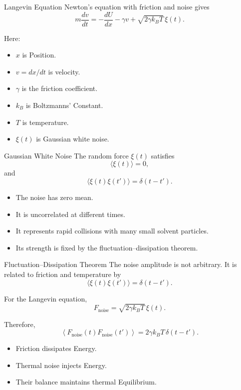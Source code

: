 \documentclass[a4paper, 10pt, onepage]{elegantbook}
\begin{document}
{\begin{frame}{Langevin Equation}
  Newton's equation with friction and noise gives
  \[
    m\frac{dv}{dt}
    =
    -\frac{dU}{dx}
    -
    \gamma v
    +
    \sqrt{2\gamma k_BT}\,\xi(t).
  \]

  Here:
  \begin{itemize}
    \item \(x\) is Position.
    \item \(v=dx/dt\) is velocity.
    \item \(\gamma\) is the friction coefficient.
    \item \(k_B\) is Boltzmanns' Constant.
    \item \(T\) is temperature.
    \item \(\xi(t)\) is Gaussian white noise.
  \end{itemize}
\end{frame}

\begin{frame}{Gaussian White Noise}
  The random force \(\xi(t)\) satisfies
  \[
    \langle\xi(t)\rangle=0,
  \]
  and
  \[
    \langle\xi(t)\xi(t')\rangle
    =
    \delta(t-t').
  \]

  \begin{itemize}
    \item The noise has zero mean.
    \item It is uncorrelated at different times.
    \item It represents rapid collisions with many small solvent particles.
    \item Its strength is fixed by the fluctuation--dissipation theorem.
  \end{itemize}
\end{frame}

\begin{frame}{Fluctuation--Dissipation Theorem}
  The noise amplitude is not arbitrary. It is related to friction and temperature by
  \[
    \langle\xi(t)\xi(t')\rangle
    =
    \delta(t-t').
  \]

  For the Langevin equation,
  \[
    F_{\mathrm{noise}}
    =
    \sqrt{2\gamma k_BT}\,\xi(t).
  \]

  Therefore,
  \[
    \left\langle
      F_{\mathrm{noise}}(t)
      F_{\mathrm{noise}}(t')
    \right\rangle
    =
    2\gamma k_BT\,\delta(t-t').
  \]

  \begin{itemize}
    \item Friction dissipates Energy.
    \item Thermal noise injects Energy.
    \item Their balance maintains thermal Equilibrium.
  \end{itemize}
\end{frame}

}
\end{document}
